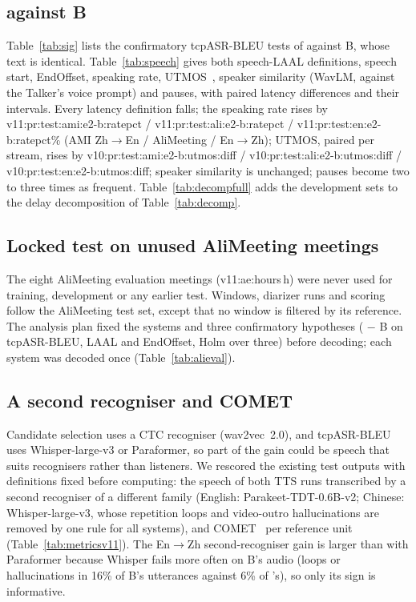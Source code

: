 \subsection{\sys{} against B}
Table~\ref{tab:sig} lists the confirmatory tcpASR-BLEU tests of \sys{} against B, whose text is identical.
Table~\ref{tab:speech} gives both speech-LAAL definitions, speech start, EndOffset, speaking rate,
UTMOS~\citep{saeki2022utmos}, speaker similarity (WavLM, against the Talker's voice prompt) and pauses, with paired
latency differences and their intervals. Every latency definition falls; the speaking rate rises by
\num{v11:pr:test:ami:e2-b:ratepct} / \num{v11:pr:test:ali:e2-b:ratepct} / \num{v11:pr:test:en:e2-b:ratepct}\%
(AMI Zh$\rightarrow$En / AliMeeting / En$\rightarrow$Zh); UTMOS, paired per stream, rises by
\num{v10:pr:test:ami:e2-b:utmos:diff} / \num{v10:pr:test:ali:e2-b:utmos:diff} / \num{v10:pr:test:en:e2-b:utmos:diff};
speaker similarity is unchanged; pauses become two to three times as frequent. Table~\ref{tab:decompfull} adds the
development sets to the delay decomposition of Table~\ref{tab:decomp}.




\ifAliEval
\subsection{Locked test on unused AliMeeting meetings}
\label{app:alieval}
The eight AliMeeting evaluation meetings (\num{v11:ae:hours}\,h) were never used for training, development or any
earlier test. Windows, diarizer runs and scoring follow the AliMeeting test set, except that no window is filtered by
its reference. The analysis plan fixed the systems and three confirmatory hypotheses (\sys{} $-$ B on tcpASR-BLEU, LAAL
and EndOffset, Holm over three) before decoding; each system was decoded once (Table~\ref{tab:alieval}).

\fi

\ifMetricsV
\subsection{A second recogniser and COMET}
\label{app:metricsv11}
Candidate selection uses a CTC recogniser (wav2vec~2.0), and tcpASR-BLEU uses Whisper-large-v3 or Paraformer, so part
of the gain could be speech that suits recognisers rather than listeners. We rescored the existing test outputs with
definitions fixed before computing: the speech of both TTS runs transcribed by a second recogniser of a different
family (English: Parakeet-TDT-0.6B-v2; Chinese: Whisper-large-v3, whose repetition loops and video-outro hallucinations
are removed by one rule for all systems), and COMET~\citep{rei2022comet} per reference unit (Table~\ref{tab:metricsv11}).
The En$\rightarrow$Zh second-recogniser gain is larger than with Paraformer because Whisper fails more often on B's
audio (loops or hallucinations in 16\% of B's utterances against 6\% of \sys{}'s), so only its sign is informative.

\fi

